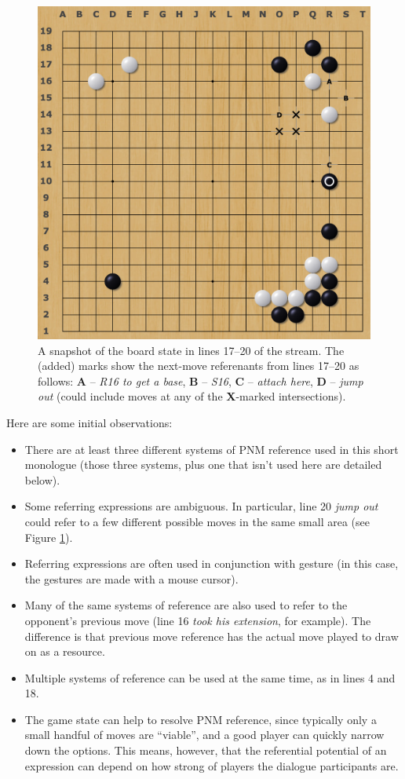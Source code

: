 \documentclass{scrartcl}
\begin{document}
\begin{figure}[ht]
  \centering
  \includegraphics[width=.5\textwidth]{diagram.png}
  \caption{A snapshot of the board state in lines 17--20 of the stream. The (added) marks show the next-move referenants from lines 17--20 as follows: \textbf{A} -- \textit{R16 to get a base}, \textbf{B} -- \textit{S16}, \textbf{C} -- \textit{attach here}, \textbf{D} -- \textit{jump out} (could include moves at any of the \textbf{X}-marked intersections).}
  \label{fig:stream-board}
\end{figure}

\noindent Here are some initial observations:
\begin{itemize}
  \item There are at least three different systems of PNM reference used in this short monologue (those three systems, plus one that isn't used here are detailed below). 
  \item Some referring expressions are ambiguous. 
    In particular, line 20 \textit{jump out} could refer to a few different possible moves in the same small area (see Figure \ref{fig:stream-board}).
  \item Referring expressions are often used in conjunction with gesture (in this case, the gestures are made with a mouse cursor).
  \item Many of the same systems of reference are also used to refer to the opponent's previous move (line 16 \textit{took his extension}, for example). The difference is that previous move reference has the actual move played to draw on as a resource.
  \item Multiple systems of reference can be used at the same time, as in lines 4 and 18.
  \item The game state can help to resolve PNM reference, since typically only a small handful of 
    moves are ``viable'', and a good player can quickly narrow down the options.
    This means, however, that the referential potential of an expression can depend on 
    how strong of players the dialogue participants are.
\end{itemize}
\end{document}
